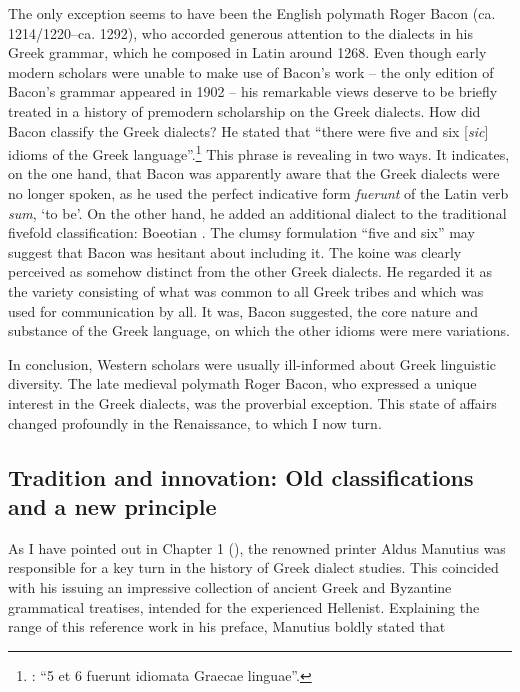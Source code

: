 \documentclass[output=paper]{langsci/langscibook}
\begin{document}
The only exception seems to have been the English polymath Roger Bacon (ca. 1214/1220–ca. 1292), who accorded generous attention to the dialects in his Greek grammar, which he composed in Latin around 1268. Even though early modern scholars were unable to make use of Bacon’s work – the only edition of Bacon’s grammar appeared in 1902 – his remarkable views deserve to be briefly treated in a history of premodern scholarship on the Greek dialects. How did Bacon classify the Greek dialects? He stated that “there were five and six [\textit{sic}] idioms of the Greek language”.\footnote{\citet[26]{Bacon1902}: “5 et 6 fuerunt idiomata Graecae linguae”.} This phrase is revealing in two ways. It indicates, on the one hand, that Bacon was apparently aware that the Greek dialects were no longer spoken, as he used the perfect indicative form \textit{fuerunt} of the Latin verb \textit{sum}, ‘to be’. On the other hand, he added an additional dialect to the traditional fivefold classification: Boeotian \citep[27]{Bacon1902}. The clumsy formulation “five and six” may suggest that Bacon was hesitant about including it. The koine was clearly perceived as somehow distinct from the other Greek dialects. He regarded it as the variety consisting of what was common to all Greek tribes and which was used for communication by all. It was, Bacon suggested, the core nature and substance of the Greek language, on which the other idioms were mere variations.

In conclusion, Western scholars were usually ill-informed about Greek linguistic diversity. The late medieval polymath Roger Bacon, who expressed a unique interest in the Greek dialects, was the proverbial exception. This state of affairs changed profoundly in the Renaissance, to which I now turn.

\subsection{Tradition and innovation: Old classifications and a new principle}
\hypertarget{Toc19704812}{}
As I have pointed out in Chapter 1 (), the renowned printer Aldus Manutius was responsible for a key turn in the history of Greek dialect studies. This coincided with his issuing an impressive collection of ancient Greek and Byzantine grammatical treatises, intended for the experienced Hellenist. Explaining the range of this reference work in his preface, Manutius boldly stated that
\end{document}
